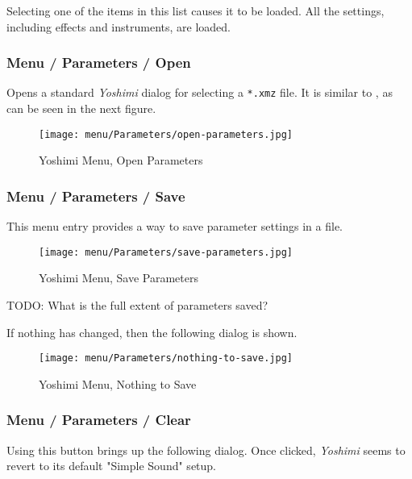    Selecting one of the items in this list causes it to be loaded.
   All the settings, including effects and instruments, are loaded.

\subsubsection{Menu / Parameters / Open}
\label{subsubsec:menu_parameters_open}

   Opens a standard \textsl{Yoshimi} dialog for selecting a
   \texttt{*.xmz} file.
   It is similar to
   ,
   as can be seen in the next figure.

\begin{figure}[H]
   \centering 
   \texttt{[image: menu/Parameters/open-parameters.jpg]}
   \caption{Yoshimi Menu, Open Parameters}
   \label{fig:yoshimi_menu_open_parameters}
\end{figure}

\subsubsection{Menu / Parameters / Save}
\label{subsubsec:menu_parameters_save}

   This menu entry provides a way to save parameter settings in
   a file.

\begin{figure}[H]
   \centering 
   \texttt{[image: menu/Parameters/save-parameters.jpg]}
   \caption{Yoshimi Menu, Save Parameters}
   \label{fig:yoshimi_menu_save_parameters}
\end{figure}

   TODO:  What is the full extent of parameters saved?

   If nothing has changed, then the following dialog is shown.

\begin{figure}[H]
   \centering 
   \texttt{[image: menu/Parameters/nothing-to-save.jpg]}
   \caption{Yoshimi Menu, Nothing to Save}
   \label{fig:yoshimi_menu_nothing_to_save_parameters}
\end{figure}

\subsubsection{Menu / Parameters / Clear}
\label{subsubsec:menu_parameters_clear}

   Using this button brings up the following dialog.  Once clicked,
   \textsl{Yoshimi} seems to revert to its default "Simple Sound" setup.

